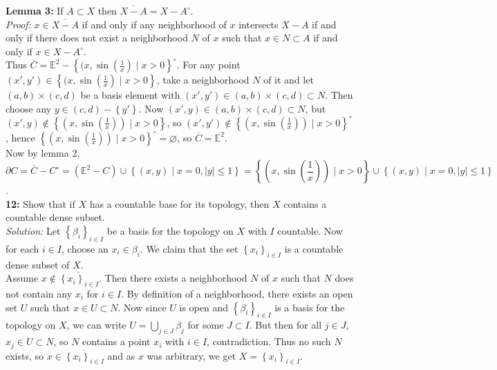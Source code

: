 \documentclass[a4paper]{article}
\begin{document}
  \textbf{Lemma 3:} If $A \subset X$ then
  $\overline{X-A} = X - A^{\circ}$.\\
  \textit{Proof:} $x \in \overline{X-A}$ if and only if any
  neighborhood of $x$ intersects $X-A$ if and only if there does not
  exist a neighborhood $N$ of $x$ such that $x \in N \subset A$ if
  and only if $x \in X- A^{\circ}$.\\
  \linebreak
  Thus $\overline{C} = \mathbb{E}^2 - 
  \left\{ (x, \sin (\frac{1}{x})  \mid x>0 \right\}^{\circ}$.
  For any point $(x',y') \in \left\{ (x, \sin (\frac{1}{x}) \mid 
  x > 0\right\} $, take a neighborhood $N$ of it and let
  $(a,b) \times (c,d)$ be a basis element with
  $(x',y') \in (a,b) \times (c,d) \subset N$. Then
  choose any $y \in (c,d) - \left\{ y' \right\} $. Now
  $(x', y) \in (a,b) \times (c,d) \subset N$, but
  $(x', y) \not\in \left\{ \left( x, \sin(\frac{1}{x}) \right)  \mid x >0
  \right\} $, so $(x',y') \not\in 
  \left\{ \left( x, \sin(\frac{1}{x}) \right) \mid x > 0  \right\}^{\circ} $,
  hence $\left\{ \left( x, \sin(\frac{1}{x}) \right)  \mid 
  x > 0 \right\}^{\circ} = \varnothing$, so
  $\overline{C} = \mathbb{E}^2$.\\
  \linebreak
  Now by lemma 2, 
  $$\partial C = \overline{C} - C^{\circ}
  = \left( \mathbb{E}^2 - C \right) \cup 
  \left\{ \left( x,y \right)  \mid x=0, |y|\le 1 \right\} 
  = \left\{ \left( x, \sin(\frac{1}{x}) \right)  \mid x>0 \right\} 
  \cup \left\{ (x,y)  \mid x=0, |y|\le 1 \right\} $$.\\
  \linebreak
  \textbf{12:} Show that if $X$ has a countable base for its topology, then
  $X$ contains a countable dense subset.\\
  \linebreak
  \textit{Solution:} Let $\left\{ \beta_i \right\}_{i \in I}$ be a basis
  for the topology on $X$ with $I$ countable. Now for each $i \in I$, choose
  an $x_i \in \beta_i$. We claim that the set
  $\left\{ x_i \right\}_{i \in I}$ is a countable dense subset of $X$.\\
  \linebreak
  Assume $x \not\in \overline{\left\{ x_i \right\}_{i \in I}}$. Then there
  exists
  a neighborhood $N$ of $x$ such that $N$ does not contain any $x_i$ for $i \in
  I$. By definition of a neighborhood, there exists an open set $U$ such that
  $x \in U \subset N$. Now since $U$ is open and $\left\{ \beta_i \right\}_{i
  \in I}$ is a basis for the topology on $X$, we can write
  $U = \bigcup_{j \in J} \beta_j$ for some $J \subset I$. But then
  for all $j \in J$, $x_j \in U \subset N$, so $N$ contains a point
  $x_i$ with $i \in I$, contradiction. Thus no such $N$ exists, so $x \in 
  \overline{\left\{ x_i \right\}_{i \in I}}$ and as $x$ was arbitrary, we get
  $X = \overline{\left\{ x_i \right\}_{i \in I}}$.
\end{document}
